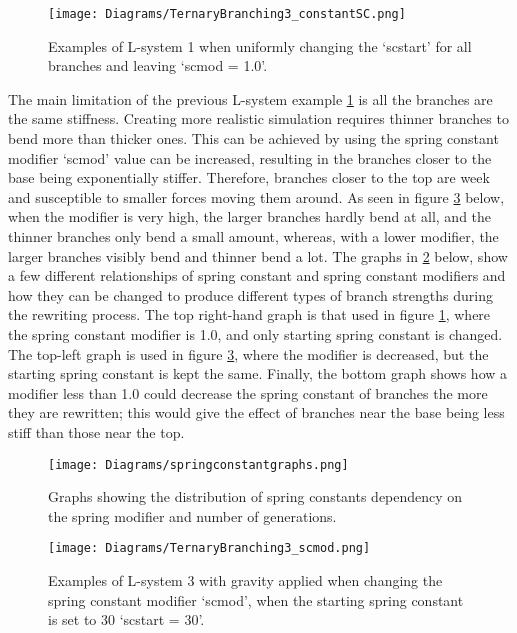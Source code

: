 \begin{figure}[htbp]
	{\centering
		\vspace{7px}
		\texttt{[image: Diagrams/TernaryBranching3\_constantSC.png]}
		\caption{Examples of L-system 1 when uniformly changing the `scstart' for all branches and leaving `scmod = 1.0'.}\label{constant spring}
	}
\end{figure}
\FloatBarrier

\noindent
The main limitation of the previous L-system example \ref{constant spring} is all the branches are the same stiffness. Creating more realistic simulation requires thinner branches to bend more than thicker ones. This can be achieved by using the spring constant modifier `scmod' value can be increased, resulting in the branches closer to the base being exponentially stiffer. Therefore, branches closer to the top are week and susceptible to smaller forces moving them around. As seen in figure \ref{increasing scmod} below, when the modifier is very high, the larger branches hardly bend at all, and the thinner branches only bend a small amount, whereas, with a lower modifier, the larger branches visibly bend and thinner bend a lot. The graphs in \ref{spring constant graphs} below, show a few different relationships of spring constant and spring constant modifiers and how they can be changed to produce different types of branch strengths during the rewriting process. The top right-hand graph is that used in figure \ref{constant spring}, where the spring constant modifier is 1.0, and only starting spring constant is changed. The top-left graph is used in figure \ref{increasing scmod}, where the modifier is decreased, but the starting spring constant is kept the same. Finally, the bottom graph shows how a modifier less than 1.0 could decrease the spring constant of branches the more they are rewritten; this would give the effect of branches near the base being less stiff than those near the top.

\begin{figure}[htbp]
	{\centering
		\vspace{7px}
		\texttt{[image: Diagrams/springconstantgraphs.png]}
		\caption{Graphs showing the distribution of spring constants dependency on the spring modifier and number of generations.}\label{spring constant graphs}
	}
\end{figure}
\FloatBarrier

\begin{figure}[htbp]
	{\centering
		\vspace{7px}
		\texttt{[image: Diagrams/TernaryBranching3\_scmod.png]}
		\caption{Examples of L-system 3 with gravity applied when changing the spring constant modifier `scmod', when the starting spring constant is set to 30 `scstart = 30'.}\label{increasing scmod}
	}
\end{figure}
\FloatBarrier

